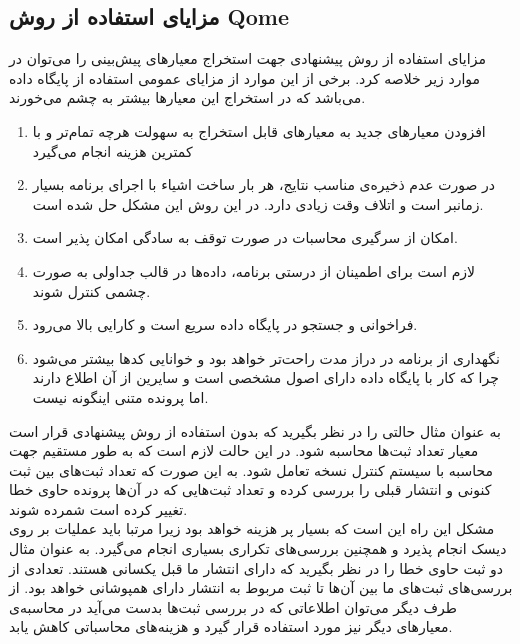 \subsection{مزایای استفاده از روش Qome}
مزایای استفاده از روش پیشنهادی جهت استخراج معیارهای پیش‌بینی را می‌توان در موارد زیر خلاصه کرد. برخی از این موارد از مزایای عمومی استفاده از پایگاه داده می‌باشد که در استخراج این معیارها بیشتر به چشم می‌خورند.
\begin{enumerate}
\item افزودن معیارهای جدید به معیارهای قابل استخراج به سهولت هرچه تمام‌تر و با کمترین هزینه انجام می‌گیرد

\item	

در صورت عدم ذخیره‌ی مناسب نتایج، هر بار ساخت اشیاء با اجرای برنامه بسیار زمانبر است و اتلاف وقت زیادی دارد. در این روش این مشکل حل شده است.
\item 
امکان از سرگیری محاسبات در صورت توقف به سادگی امکان پذیر است.

\item
لازم است برای اطمینان از درستی برنامه، داده‌ها در قالب جداولی به صورت چشمی کنترل شوند.
\item
فراخوانی و جستجو در پایگاه داده سریع است و کارایی بالا می‌رود.
\item
نگهداری از برنامه در دراز مدت راحت‌تر خواهد بود و خوانایی کدها بیشتر می‌شود چرا که کار با پایگاه داده دارای اصول مشخصی است و سایرین از آن اطلاع دارند اما پرونده متنی اینگونه نیست.
\end{enumerate}

به عنوان مثال حالتی را در نظر بگیرید که  بدون استفاده از روش پیشنهادی  قرار است معیار تعداد ثبت‌ها محاسبه شود. در این حالت لازم است که به طور مستقیم جهت محاسبه با سیستم کنترل نسخه تعامل شود.  به این صورت که تعداد ثبت‌های بین ثبت کنونی و انتشار قبلی  را بررسی کرده و تعداد  ثبت‌هایی که در آن‌ها پرونده حاوی خطا تغییر کرده است شمرده شوند.\\ مشکل این راه این است که بسیار پر هزینه  خواهد بود زیرا مرتبا باید عملیات  بر روی دیسک انجام پذیرد و همچنین بررسی‌های تکراری بسیاری انجام می‌گیرد. به عنوان مثال دو ثبت حاوی خطا را در نظر بگیرید که دارای انتشار ما قبل یکسانی هستند. تعدادی از بررسی‌های ثبت‌های ما بین آن‌ها تا ثبت مربوط به انتشار دارای همپوشانی خواهد بود. از طرف دیگر می‌توان اطلاعاتی که در بررسی ثبت‌ها بدست می‌آید در محاسبه‌ی معیارهای دیگر نیز مورد استفاده قرار گیرد و هزینه‌های محاسباتی کاهش یابد. 

